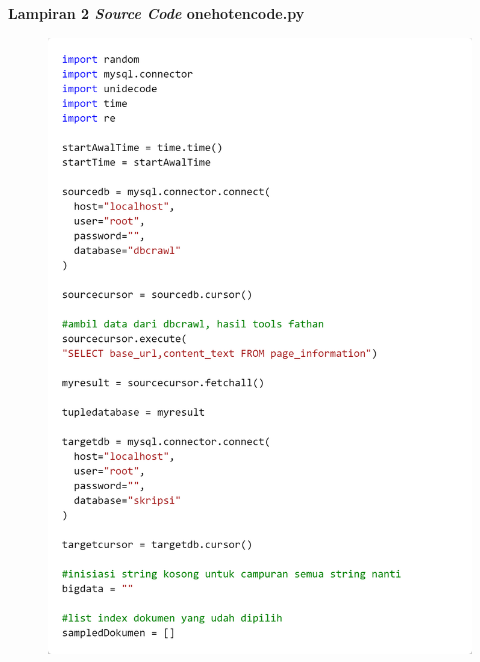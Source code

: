 \documentclass[12pt]{report}
\begin{document}
\newpage
{\parindent0pt \textbf{Lampiran 2 \textit{Source Code} onehotencode.py}}
\begin{figure}[H]
\centering
\includegraphics[scale=0.3]{onehotencode1}
\end{figure}
\end{document}
